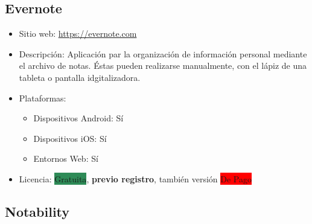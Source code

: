 \documentclass[11pt]{article}
\newcommand{\gratis}{\colorbox{SeaGreen}{Gratuita}}
\newcommand{\pago}{\colorbox{Red}{De Pago}}
\begin{document}
\subsection{Evernote}

\begin{itemize}
\item Sitio web: \url{https://evernote.com}
\item Descripción: Aplicación par la organización de información personal mediante el archivo de notas. Éstas pueden realizarse manualmente, con el lápiz de una tableta o pantalla idgitalizadora.
\item Plataformas:
  \begin{itemize}
  \item Dispositivos Android: Sí
  \item Dispositivos iOS: Sí
  \item Entornos Web: Sí
  \end{itemize}
\item Licencia: \gratis, \textbf{previo registro}, también versión \pago
\end{itemize}

\subsection{Notability}
\end{document}
